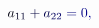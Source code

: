 \documentclass[12pt]{article}
\begin{document}
\makeatletter
\renewcommand*{\@textcolor}[3]{%
  \protect\leavevmode
  \begingroup
    \color#1{#2}#3%
  \endgroup
}
\makeatother
\begin{displaymath}
\mathcolor[RGB]{0,0,15}{a} _ { \mathcolor[RGB]{0,0,30}{1} \mathcolor[RGB]{0,0,45}{1} } \mathcolor[RGB]{0,0,60}{+} \mathcolor[RGB]{0,0,75}{a} _ { \mathcolor[RGB]{0,0,90}{2} \mathcolor[RGB]{0,0,105}{2} } \mathcolor[RGB]{0,0,120}{=} \mathcolor[RGB]{0,0,135}{0} \mathcolor[RGB]{0,0,150}{,} \,
\end{displaymath}
\end{document}
